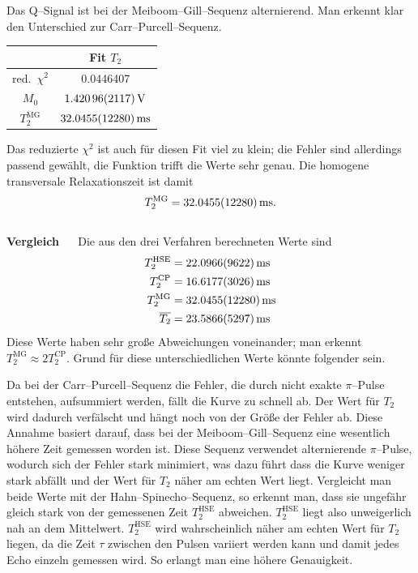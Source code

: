 \documentclass[10pt]{article}
\newenvironment{Figure}
  {\par\medskip\noindent\minipage{\linewidth}}
  {\endminipage\par\medskip}
\begin{document}
\begin{multicols}{2}
Das Q--Signal ist bei der Meiboom--Gill--Sequenz alternierend.
Man erkennt klar den Unterschied zur Carr--Purcell--Sequenz.
  \begin{Figure}
    \centering\resizebox{\textwidth}{!}{}
    \label{fig:mg}
  \end{Figure}
  \begin{center}
    \begin{tabular}{c|c}
    & Fit $T_2$\\
    \hline
    red.\ $\chi ^2$ &  0.0446407\\
    $M_0$ & $\SI{1.42096+-0.02117}{V}$ \\
    $T_2^{\text{MG}}$ & $\SI{32.0455+-1.228}{ms}$ 
    \end{tabular}
  \label{Tab:mg_para}
  \end{center}
Das reduzierte $\chi ^2$ ist auch für diesen Fit viel zu klein; die Fehler sind allerdings passend gewählt, die Funktion trifft die Werte sehr genau.
Die homogene transversale Relaxationszeit ist damit
\begin{align} 
        T_2^{\text{MG}}=\SI{32.0455+-1.228}{ms}
.\end{align} 
\\\textbf{Vergleich} $\quad$ 
Die aus den drei Verfahren berechneten Werte sind
\begin{align} 
        T_2^{\text{HSE}}&=\SI{22.0966+-0.9622}{ms}\\
        T_2^{\text{CP}}&=\SI{16.6177+-0.3026}{ms}\\
        T_2^{\text{MG}}&=\SI{32.0455+-1.228}{ms}\\
        \overline{T_2}&=\SI{23.5866+-0.5297}{ms}
\end{align} 
Diese Werte haben sehr große Abweichungen voneinander; man erkennt $T_2^{\text{MG}}\approx 2T_2^{\text{CP}}$. Grund für diese unterschiedlichen Werte könnte folgender sein.

Da bei der Carr--Purcell--Sequenz die Fehler, die durch nicht exakte $\pi $--Pulse entstehen, aufsummiert werden, fällt die Kurve zu schnell ab.
Der Wert für $T_2$ wird dadurch verfälscht und hängt noch von der Größe der Fehler ab.
Diese Annahme basiert darauf, dass bei der Meiboom--Gill--Sequenz eine wesentlich höhere Zeit gemessen worden ist.
Diese Sequenz verwendet alternierende $\pi $--Pulse, wodurch sich der Fehler stark minimiert, was dazu führt dass die Kurve weniger stark abfällt und der Wert für $T_2$ näher am echten Wert liegt.
Vergleicht man beide Werte mit der Hahn--Spinecho--Sequenz, so erkennt man, dass sie ungefähr gleich stark von der gemessenen Zeit $T_2^{\text{HSE}}$ abweichen.
$T_2^{\text{HSE}}$ liegt also unweigerlich nah an dem Mittelwert.
$T_2^{\text{HSE}}$ wird wahrscheinlich näher am echten Wert für $T_2$ liegen, da die Zeit $\tau $ zwischen den Pulsen variiert werden kann und damit jedes Echo einzeln gemessen wird.
So erlangt man eine höhere Genauigkeit.


\end{multicols}
\end{document}

